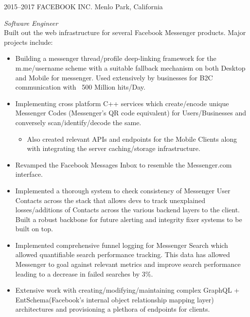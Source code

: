 \documentclass[print]{friggeri-cv} %
\begin{document}
\begin{entrylist}

\entry
{2015--2017}
{FACEBOOK INC.}
{Menlo Park, California}
{\emph{Software Engineer} \\
Built out the web infrastructure for several Facebook Messenger products. Major projects include:

\begin{itemize}
\item Building a messenger thread/profile deep-linking framework for the m.me/{username} scheme with a suitable fallback mechanism on both Desktop and Mobile for messenger. Used extensively by businesses for B2C communication with ~500 Million hits/Day.
\item Implementing cross platform C++ services which create/encode unique Messenger Codes (Messenger's QR code equivalent) for Users/Businesses and conversely scan/identify/decode the same.
\begin{itemize}
\item Also created relevant APIs and endpoints for the Mobile Clients along with integrating the server caching/storage infrastructure.
\end{itemize}
\item Revamped the Facebook Messages Inbox to resemble the Messenger.com interface.
\item Implemented a thorough system to check consistency of Messenger User Contacts across the stack that allows devs to track unexplained losses/additions of Contacts across the various backend layers to the client. Built a robust backbone for future alerting and integrity fixer systems to be built on top.
\item Implemented comprehensive funnel logging for Messenger Search which allowed quantifiable search performance tracking. This data has allowed Messenger to goal against relevant metrics and improve search performance leading to a decrease in failed searches by 3\%.
\item Extensive work with creating/modifying/maintaining complex GraphQL + EntSchema(Facebook's internal object relationship mapping layer) architectures and provisioning a plethora of endpoints for clients.
\end{itemize}}

\end{entrylist}
\end{document}
